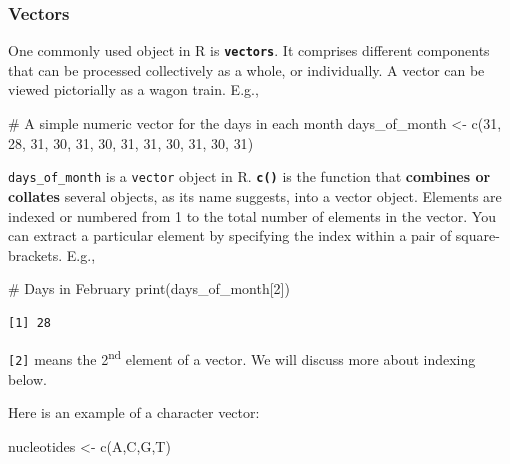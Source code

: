 \documentclass[
  letterpaper,
]{book}
\newenvironment{Shaded}{\begin{snugshade}}{\end{snugshade}}
\newcommand{\CommentTok}[1]{\textcolor[rgb]{0.37,0.37,0.37}{#1}}
\newcommand{\DecValTok}[1]{\textcolor[rgb]{0.68,0.00,0.00}{#1}}
\newcommand{\FunctionTok}[1]{\textcolor[rgb]{0.28,0.35,0.67}{#1}}
\newcommand{\NormalTok}[1]{\textcolor[rgb]{0.00,0.23,0.31}{#1}}
\newcommand{\OtherTok}[1]{\textcolor[rgb]{0.00,0.23,0.31}{#1}}
\newcommand{\StringTok}[1]{\textcolor[rgb]{0.13,0.47,0.30}{#1}}
\begin{document}
\subsubsection*{Vectors}\label{vectors}

One commonly used object in R is \textbf{\texttt{vectors}}. It comprises
different components that can be processed collectively as a whole, or
individually. A vector can be viewed pictorially as a wagon train. E.g.,

\begin{Shaded}
\begin{Highlighting}[]
\CommentTok{\# A simple numeric vector for the days in each month}
\NormalTok{days\_of\_month }\OtherTok{\textless{}{-}} \FunctionTok{c}\NormalTok{(}\DecValTok{31}\NormalTok{, }\DecValTok{28}\NormalTok{, }\DecValTok{31}\NormalTok{, }\DecValTok{30}\NormalTok{, }\DecValTok{31}\NormalTok{, }\DecValTok{30}\NormalTok{, }\DecValTok{31}\NormalTok{, }\DecValTok{31}\NormalTok{, }\DecValTok{30}\NormalTok{, }\DecValTok{31}\NormalTok{, }\DecValTok{30}\NormalTok{, }\DecValTok{31}\NormalTok{)}
\end{Highlighting}
\end{Shaded}

\texttt{days\_of\_month} is a \texttt{vector} object in R.
\textbf{\texttt{c()}} is the function that \textbf{combines or collates}
several objects, as its name suggests, into a vector object. Elements
are indexed or numbered from 1 to the total number of elements in the
vector. You can extract a particular element by specifying the index
within a pair of square-brackets. E.g.,

\begin{Shaded}
\begin{Highlighting}[]
\CommentTok{\# Days in February}
\FunctionTok{print}\NormalTok{(days\_of\_month[}\DecValTok{2}\NormalTok{])}
\end{Highlighting}
\end{Shaded}

\begin{verbatim}
[1] 28
\end{verbatim}

\texttt{{[}2{]}} means the 2\textsuperscript{nd} element of a vector. We
will discuss more about indexing below.

Here is an example of a character vector:

\begin{Shaded}
\begin{Highlighting}[]
\NormalTok{nucleotides }\OtherTok{\textless{}{-}} \FunctionTok{c}\NormalTok{(}\StringTok{\textquotesingle{}A\textquotesingle{}}\NormalTok{,}\StringTok{\textquotesingle{}C\textquotesingle{}}\NormalTok{,}\StringTok{\textquotesingle{}G\textquotesingle{}}\NormalTok{,}\StringTok{\textquotesingle{}T\textquotesingle{}}\NormalTok{)}
\end{Highlighting}
\end{Shaded}
\end{document}
